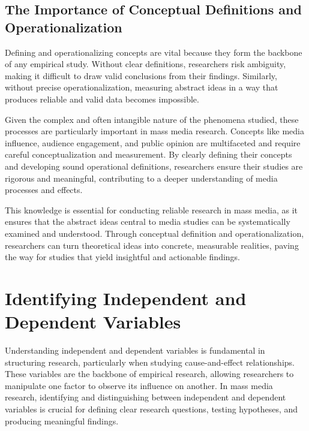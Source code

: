 \documentclass[
]{book}
\begin{document}
\subsection*{The Importance of Conceptual Definitions and Operationalization}\label{the-importance-of-conceptual-definitions-and-operationalization}

Defining and operationalizing concepts are vital because they form the backbone of any empirical study. Without clear definitions, researchers risk ambiguity, making it difficult to draw valid conclusions from their findings. Similarly, without precise operationalization, measuring abstract ideas in a way that produces reliable and valid data becomes impossible.

Given the complex and often intangible nature of the phenomena studied, these processes are particularly important in mass media research. Concepts like media influence, audience engagement, and public opinion are multifaceted and require careful conceptualization and measurement. By clearly defining their concepts and developing sound operational definitions, researchers ensure their studies are rigorous and meaningful, contributing to a deeper understanding of media processes and effects.

This knowledge is essential for conducting reliable research in mass media, as it ensures that the abstract ideas central to media studies can be systematically examined and understood. Through conceptual definition and operationalization, researchers can turn theoretical ideas into concrete, measurable realities, paving the way for studies that yield insightful and actionable findings.

\section{Identifying Independent and Dependent Variables}\label{identifying-independent-and-dependent-variables}

Understanding independent and dependent variables is fundamental in structuring research, particularly when studying cause-and-effect relationships. These variables are the backbone of empirical research, allowing researchers to manipulate one factor to observe its influence on another. In mass media research, identifying and distinguishing between independent and dependent variables is crucial for defining clear research questions, testing hypotheses, and producing meaningful findings.
\end{document}
